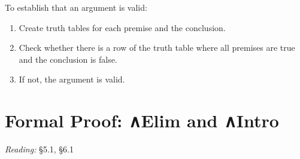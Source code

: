 \documentclass[12pt]{extarticle}
\begin{document}
\begin{multicols*}{3}
\begin{minipage}{\columnwidth}
 
To establish that an argument is valid:
 
\begin{enumerate}
 
\item Create truth tables for each premise and the conclusion.
 
\item Check whether there is a row of the truth table where all premises are true and the conclusion is false.
 
\item If not, the argument is valid.
 
\end{enumerate}
 
\end{minipage}
 
 
 
\section{Formal Proof: ∧Elim and ∧Intro}
 
\emph{Reading:} §5.1, §6.1
 

\end{multicols*}
\end{document}
